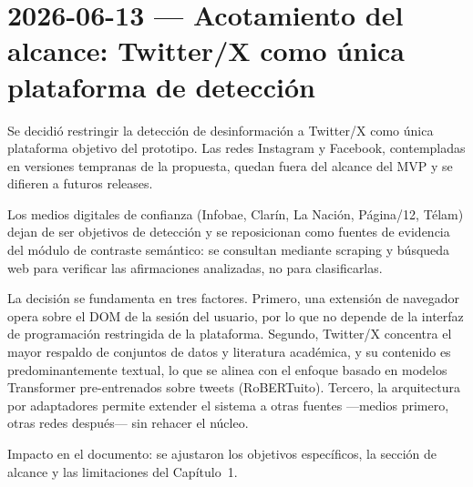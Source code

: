 \section{2026-06-13 — Acotamiento del alcance: Twitter/X como única plataforma de detección}

Se decidió restringir la detección de desinformación a Twitter/X como única plataforma objetivo del prototipo. Las redes Instagram y Facebook, contempladas en versiones tempranas de la propuesta, quedan fuera del alcance del MVP y se difieren a futuros releases.

Los medios digitales de confianza (Infobae, Clarín, La Nación, Página/12, Télam) dejan de ser objetivos de detección y se reposicionan como fuentes de evidencia del módulo de contraste semántico: se consultan mediante scraping y búsqueda web para verificar las afirmaciones analizadas, no para clasificarlas.

La decisión se fundamenta en tres factores. Primero, una extensión de navegador opera sobre el DOM de la sesión del usuario, por lo que no depende de la interfaz de programación restringida de la plataforma. Segundo, Twitter/X concentra el mayor respaldo de conjuntos de datos y literatura académica, y su contenido es predominantemente textual, lo que se alinea con el enfoque basado en modelos Transformer pre-entrenados sobre tweets (RoBERTuito). Tercero, la arquitectura por adaptadores permite extender el sistema a otras fuentes —medios primero, otras redes después— sin rehacer el núcleo.

Impacto en el documento: se ajustaron los objetivos específicos, la sección de alcance y las limitaciones del Capítulo~1.
